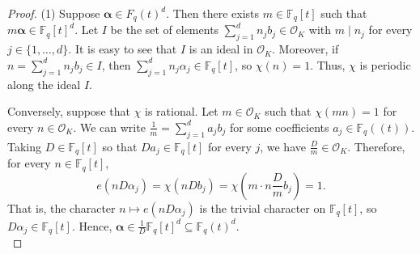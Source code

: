 \documentclass{amsart}
\theoremstyle{definition}
\numberwithin{equation}{section}
\newcommand{\F}{\mathbb{F}}
\newcommand{\mO}{\mathcal{O}}
\begin{document}
\begin{proof}
   (1)
   Suppose $\bm{\alpha} \in F_q(t)^d$.
   Then there exists $m \in \F_q[t]$ such that $m\bm{\alpha} \in \F_q[t]^d$.
   Let $I$ be the set of elements $\sum_{j=1}^d n_j b_j \in \mO_K$ with $m \mid n_j$ for every $j \in \{1, \ldots, d\}$.
   It is easy to see that $I$ is an ideal in $\mO_K$.
   Moreover, if $n = \sum_{j=1}^d n_j b_j \in I$, then $\sum_{j=1}^d n_j \alpha_j \in \F_q[t]$, so $\chi(n) = 1$.
   Thus, $\chi$ is periodic along the ideal $I$.

   Conversely, suppose that $\chi$ is rational.
   Let $m \in \mO_K$ such that $\chi(mn) = 1$ for every $n \in \mO_K$.
   We can write $\frac{1}{m} = \sum_{j=1}^d a_j b_j$ for some coefficients $a_j \in \F_q((t))$.
   Taking $D \in \F_q[t]$ so that $Da_j \in \F_q[t]$ for every $j$, we have $\frac{D}{m} \in \mO_K$.
   Therefore, for every $n \in \F_q[t]$,
   \begin{equation*}
       e(n D\alpha_j) = \chi(nDb_j) = \chi \left( m \cdot n\frac{D}{m}b_j \right) = 1.
   \end{equation*}
   That is, the character $n \mapsto e(nD\alpha_j)$ is the trivial character on $\F_q[t]$, so $D\alpha_j \in \F_q[t]$.
   Hence, $\bm{\alpha} \in \frac{1}{D} \F_q[t]^d \subseteq \F_q(t)^d$. \\
   

\end{proof}
\end{document}

